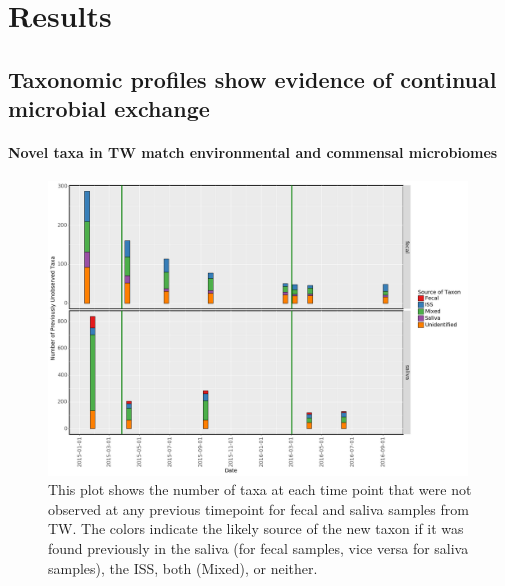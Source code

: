 
\section{Results}

\subsection{Taxonomic profiles show evidence of continual microbial exchange}



\paragraph{Novel taxa in TW match environmental and commensal microbiomes}

\begin{figure}
  \begin{center}
    \includegraphics[width=0.99\textwidth]{figs/twins_taxa_sources.png}
	\caption{\small{
	    This plot shows the number of taxa at each time point that were not observed at any previous timepoint for fecal and saliva samples from TW. The colors indicate the likely source of the new taxon if it was found previously in the saliva (for fecal samples, vice versa for saliva samples), the ISS, both (Mixed), or neither.
	}}
    \label{fig:taxasource}
  \end{center}
\end{figure}

